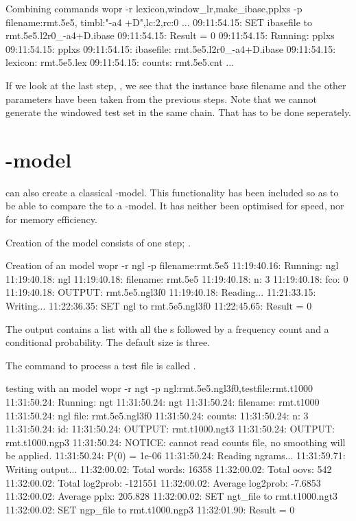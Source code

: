\documentclass[a4paper,10pt,twoside]{report}
\begin{document}
\begin{bash}{Combining commands}
wopr -r lexicon,window_lr,make_ibase,pplxs -p filename:rmt.5e5,
                                              timbl:"-a4 +D",lc:2,rc:0
...
09:11:54.15: SET ibasefile to rmt.5e5.l2r0_-a4+D.ibase
09:11:54.15: Result = 0
09:11:54.15: Running: pplxs
09:11:54.15: pplxs
09:11:54.15:  ibasefile:      rmt.5e5.l2r0_-a4+D.ibase
09:11:54.15:  lexicon:        rmt.5e5.lex
09:11:54.15:  counts:         rmt.5e5.cnt
...
\end{bash}

If we look at the last step, , we see that the instance base
filename and the other parameters have been taken from the previous
steps. Note that we cannot generate the windowed test set in the
same chain. That has to be done seperately.

\section{\ngram{}-model}

\Wopr{} can also create a classical \ngram{}-model. This functionality
has been included so as to be able to compare the \mb{} \lm{} to a 
 \ngram{}-model. It has neither been optimised for speed,
nor for memory efficiency.

Creation of the model consists of one step; .

\begin{bash}{Creation of an \ngram{} model}
wopr -r ngl -p filename:rmt.5e5
11:19:40.16: Running: ngl
11:19:40.18: ngl
11:19:40.18:  filename:  rmt.5e5
11:19:40.18:  n:         3
11:19:40.18:  fco:       0
11:19:40.18:  OUTPUT:    rmt.5e5.ngl3f0
11:19:40.18: Reading...
11:21:33.15: Writing...
11:22:36.35: SET ngl to rmt.5e5.ngl3f0
11:22:45.65: Result = 0
\end{bash}

The output contains a list with all the \ngram{}s followed by a
frequency count and a conditional probability. The default \ngram{}
size is three.

The command to process a test file is called .

\begin{bash}{testing with an \ngram{} model}
wopr -r ngt -p ngl:rmt.5e5.ngl3f0,testfile:rmt.t1000
11:31:50.24: Running: ngt
11:31:50.24: ngt
11:31:50.24:  filename:  rmt.t1000
11:31:50.24:  ngl file:  rmt.5e5.ngl3f0
11:31:50.24:  counts:    
11:31:50.24:  n:         3
11:31:50.24:  id:        
11:31:50.24:  OUTPUT:    rmt.t1000.ngt3
11:31:50.24:  OUTPUT:    rmt.t1000.ngp3
11:31:50.24: NOTICE: cannot read counts file, no smoothing will be applied.
11:31:50.24: P(0) = 1e-06
11:31:50.24: Reading ngrams...
11:31:59.71: Writing output...
11:32:00.02: Total words: 16358
11:32:00.02: Total oovs: 542
11:32:00.02: Total log2prob: -121551
11:32:00.02: Average log2prob: -7.6853
11:32:00.02: Average pplx: 205.828
11:32:00.02: SET ngt_file to rmt.t1000.ngt3
11:32:00.02: SET ngp_file to rmt.t1000.ngp3
11:32:01.90: Result = 0
\end{bash}
\end{document}
